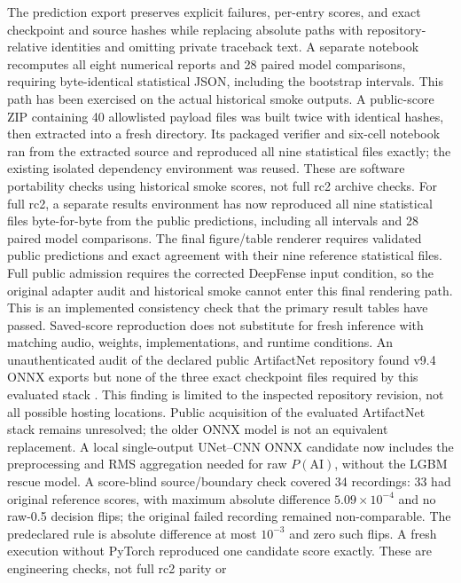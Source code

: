 \documentclass[10pt,a4paper]{article}
\begin{document}
The prediction export preserves explicit failures, per-entry scores, and exact
checkpoint and source hashes while replacing absolute paths with repository-relative
identities and omitting private traceback text. A separate notebook recomputes
all eight numerical reports and 28 paired model comparisons, requiring
byte-identical statistical JSON, including the bootstrap intervals. This path
has been exercised on the actual historical smoke outputs. A public-score ZIP
containing 40 allowlisted payload files was built twice with identical hashes,
then extracted into a fresh directory. Its packaged verifier and six-cell notebook
ran from the extracted source and reproduced all nine statistical files exactly;
the existing isolated dependency environment was reused. These are software
portability checks using historical smoke scores, not full rc2 archive checks.
For full rc2, a separate results environment has now reproduced all nine
statistical files byte-for-byte from the public predictions, including all
intervals and 28 paired model comparisons. The final figure/table renderer
requires validated public predictions and exact agreement with their nine
reference statistical files. Full public admission requires the corrected
DeepFense input condition, so the original adapter audit and historical smoke
cannot enter this final rendering path. This is an implemented consistency
check that the primary result tables have passed. Saved-score reproduction
does not substitute for fresh inference with matching audio, weights,
implementations, and runtime conditions. An unauthenticated
audit of the declared public ArtifactNet repository found v9.4 ONNX exports but
none of the three exact checkpoint files required by this evaluated stack
\citep{artifactnet_public_2026}. This finding is limited to the inspected repository
revision, not all possible hosting locations. Public acquisition of the evaluated
ArtifactNet stack remains unresolved; the older ONNX model is not an equivalent
replacement. A local single-output UNet--CNN ONNX candidate now includes the
preprocessing and RMS aggregation needed for raw $P(\mathrm{AI})$, without the
LGBM rescue model. A score-blind source/boundary check covered 34 recordings:
33 had original reference scores, with maximum absolute difference
$5.09\times10^{-4}$ and no raw-0.5 decision flips; the original failed recording
remained non-comparable. The predeclared rule is absolute difference at most
$10^{-3}$ and zero such flips. A fresh execution without PyTorch reproduced one
candidate score exactly. These are engineering checks, not full rc2 parity or
\end{document}
